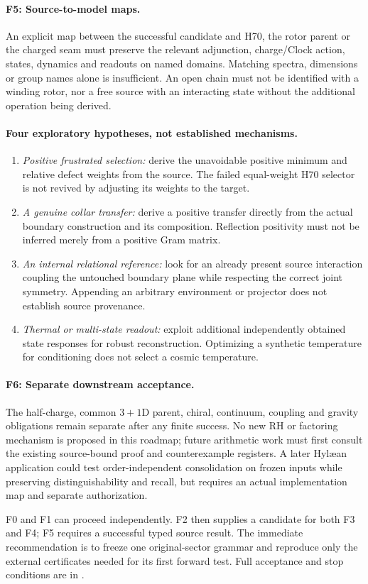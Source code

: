 \paragraph{F5: Source-to-model maps.}
An explicit map between the successful candidate and H70, the rotor parent
or the charged seam must preserve the relevant adjunction, charge/Clock
action, states, dynamics and readouts on named domains. Matching spectra,
dimensions or group names alone is insufficient. An open chain must not
be identified with a winding rotor, nor a free source with an interacting
state without the additional operation being derived.

\paragraph{Four exploratory hypotheses, not established mechanisms.}
\begin{enumerate}[leftmargin=*]
\item \emph{Positive frustrated selection:} derive the unavoidable positive
minimum and relative defect weights from the source. The failed equal-weight
H70 selector is not revived by adjusting its weights to the target.
\item \emph{A genuine collar transfer:} derive a positive transfer directly
from the actual boundary construction and its composition. Reflection
positivity must not be inferred merely from a positive Gram matrix.
\item \emph{An internal relational reference:} look for an already present
source interaction coupling the untouched boundary plane while respecting
the correct joint symmetry. Appending an arbitrary environment or projector
does not establish source provenance.
\item \emph{Thermal or multi-state readout:} exploit additional independently
obtained state responses for robust reconstruction. Optimizing a synthetic
temperature for conditioning does not select a cosmic temperature.
\end{enumerate}

\paragraph{F6: Separate downstream acceptance.}
The half-charge, common $3+1$D parent, chiral, continuum, coupling and
gravity obligations remain separate after any finite success. No new RH
or factoring mechanism is proposed in this roadmap; future arithmetic
work must first consult the existing source-bound proof and counterexample
registers. A later Hyl\ae an application could test order-independent
consolidation on frozen inputs while preserving distinguishability and
recall, but requires an actual implementation map and separate authorization.

F0 and F1 can proceed independently. F2 then supplies a candidate for both
F3 and F4; F5 requires a successful typed source result. The immediate
recommendation is to freeze one original-sector grammar and reproduce only
the external certificates needed for its first forward test. Full acceptance
and stop conditions are in
.

